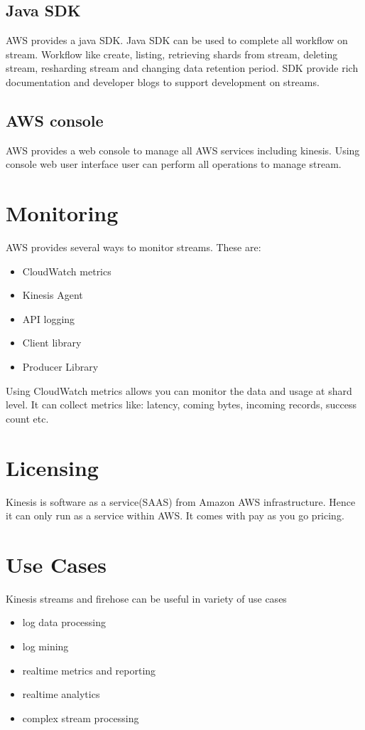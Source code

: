 \documentclass[9pt,twocolumn,twoside]{../../styles/osajnl}
\begin{document}
\subsection{Java SDK}
AWS provides a java SDK. Java SDK \cite{www-kinesis-javasdk} can be used to complete all workflow on stream. Workflow like create, listing, retrieving shards from stream, deleting stream, resharding stream and changing data retention period. SDK provide rich documentation and developer blogs to support development on streams.

\subsection{AWS console}
AWS provides a web console to manage all AWS services including kinesis.  Using console web user interface user can perform all operations to manage stream.

\section{Monitoring}
AWS provides several ways to monitor streams. These are:
\begin{itemize}
	\item  CloudWatch metrics
	\item Kinesis Agent 
	\item API logging
	\item Client library
	\item Producer Library 
\end{itemize}

Using CloudWatch metrics allows you can monitor the data and usage at shard level.  It can collect metrics like: latency, coming bytes, incoming records, success count etc.

\section{Licensing}
Kinesis is software as a service(SAAS) from Amazon AWS infrastructure. Hence it can only run as a service within AWS. It comes with pay as you go pricing.

\section{Use Cases}

Kinesis streams and firehose can be useful in variety of use cases \cite{www-kinesis} 
\begin{itemize}
	\item  log data processing
	\item log mining
	\item realtime metrics and reporting
	\item realtime analytics
	\item complex stream processing
\end{itemize}
\end{document}
